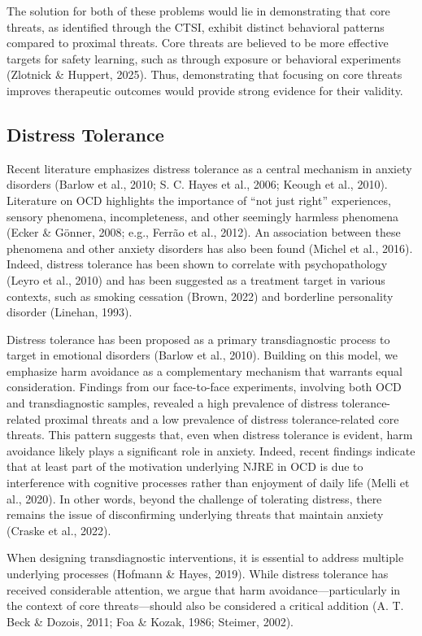 \documentclass[
  man,floatsintext]{apa7}
\begin{document}
The solution for both of these problems would lie in demonstrating that core threats, as identified through the CTSI, exhibit distinct behavioral patterns compared to proximal threats.
Core threats are believed to be more effective targets for safety learning, such as through exposure or behavioral experiments (Zlotnick \& Huppert, 2025).
Thus, demonstrating that focusing on core threats improves therapeutic outcomes would provide strong evidence for their validity.

\subsection{Distress Tolerance}\label{distress-tolerance}

Recent literature emphasizes distress tolerance as a central mechanism in anxiety disorders (Barlow et al., 2010; S. C. Hayes et al., 2006; Keough et al., 2010).
Literature on OCD highlights the importance of ``not just right'' experiences, sensory phenomena, incompleteness, and other seemingly harmless phenomena (Ecker \& Gönner, 2008; e.g., Ferrão et al., 2012).
An association between these phenomena and other anxiety disorders has also been found (Michel et al., 2016).
Indeed, distress tolerance has been shown to correlate with psychopathology (Leyro et al., 2010) and has been suggested as a treatment target in various contexts, such as smoking cessation (Brown, 2022) and borderline personality disorder (Linehan, 1993).

Distress tolerance has been proposed as a primary transdiagnostic process to target in emotional disorders (Barlow et al., 2010).
Building on this model, we emphasize harm avoidance as a complementary mechanism that warrants equal consideration.
Findings from our face-to-face experiments, involving both OCD and transdiagnostic samples, revealed a high prevalence of distress tolerance-related proximal threats and a low prevalence of distress tolerance-related core threats.
This pattern suggests that, even when distress tolerance is evident, harm avoidance likely plays a significant role in anxiety.
Indeed, recent findings indicate that at least part of the motivation underlying NJRE in OCD is due to interference with cognitive processes rather than enjoyment of daily life (Melli et al., 2020).
In other words, beyond the challenge of tolerating distress, there remains the issue of disconfirming underlying threats that maintain anxiety (Craske et al., 2022).

When designing transdiagnostic interventions, it is essential to address multiple underlying processes (Hofmann \& Hayes, 2019).
While distress tolerance has received considerable attention, we argue that harm avoidance---particularly in the context of core threats---should also be considered a critical addition (A. T. Beck \& Dozois, 2011; Foa \& Kozak, 1986; Steimer, 2002).
\end{document}
